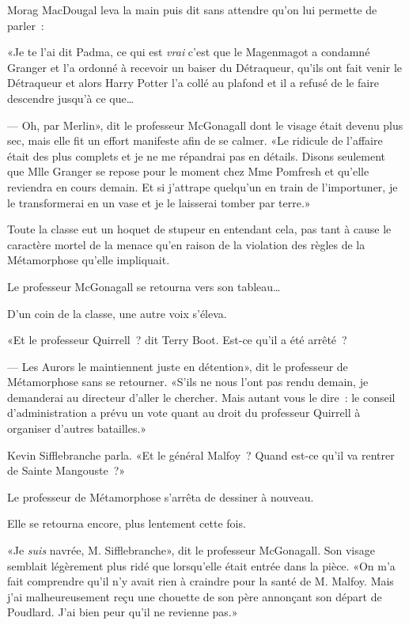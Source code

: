 Morag MacDougal leva la main puis dit sans attendre qu'on lui permette de parler~:

«Je te l'ai dit Padma, ce qui est \emph{vrai} c'est que le Magenmagot a condamné Granger et l'a ordonné à recevoir un baiser du Détraqueur, qu'ils ont fait venir le Détraqueur et alors Harry Potter l'a collé au plafond et il a refusé de le faire descendre jusqu'à ce que… 

---  Oh, par Merlin», dit le professeur McGonagall dont le visage était devenu plus sec, mais elle fit un effort manifeste afin de se calmer. «Le ridicule de l'affaire était des plus complets et je ne me répandrai pas en détails. Disons seulement que Mlle Granger se repose pour le moment chez Mme Pomfresh et qu'elle reviendra en cours demain. Et si j'attrape quelqu'un en train de l'importuner, je le transformerai en un vase et je le laisserai tomber par terre.»

Toute la classe eut un hoquet de stupeur en entendant cela, pas tant à cause le caractère mortel de la menace qu'en raison de la violation des règles de la Métamorphose qu'elle impliquait.

Le professeur McGonagall se retourna vers son tableau…

D'un coin de la classe, une autre voix s'éleva.

«Et le professeur Quirrell~? dit Terry Boot. Est-ce qu'il a été arrêté~? 

---  Les Aurors le maintiennent juste en détention», dit le professeur de Métamorphose sans se retourner. «S'ils ne nous l'ont pas rendu demain, je demanderai au directeur d'aller le chercher. Mais autant vous le dire~: le conseil d'administration a prévu un vote quant au droit du professeur Quirrell à organiser d'autres batailles.»

Kevin Sifflebranche parla. «Et le général Malfoy~? Quand est-ce qu'il va rentrer de Sainte Mangouste~?»

Le professeur de Métamorphose s'arrêta de dessiner à nouveau.

Elle se retourna encore, plus lentement cette fois.

«Je \emph{suis} navrée, M. Sifflebranche», dit le professeur McGonagall. Son visage semblait légèrement plus ridé que lorsqu'elle était entrée dans la pièce. «On m'a fait comprendre qu'il n'y avait rien à craindre pour la santé de M. Malfoy. Mais j'ai malheureusement reçu une chouette de son père annonçant son départ de Poudlard. J'ai bien peur qu'il ne revienne pas.»
